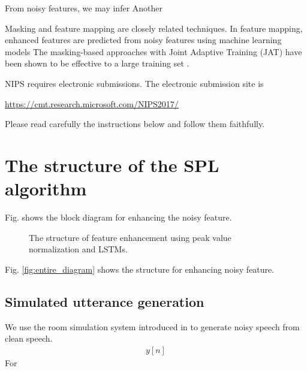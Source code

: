\documentclass{article}
\begin{document}
From noisy features, we may infer 
Another 

Masking and feature mapping are closely related techniques.
In feature mapping, enhanced features are predicted from
noisy features using machine learning models
The masking-based approaches with
Joint Adaptive Training (JAT) have been shown
to be effective to a large training set
\cite{a_narayanan_interspeech_2015_1}.




NIPS requires electronic submissions.  The electronic submission site
is
\begin{center}
  \url{https://cmt.research.microsoft.com/NIPS2017/}
\end{center}

Please read carefully the instructions below and follow them
faithfully.

\section{The structure of the SPL algorithm}

Fig. \label{fig:entire_diagram} shows the block diagram for
enhancing the noisy feature.

\begin{figure}
    \centering
    \resizebox{80mm}{!}{%
         } %
    \caption {
      The structure of feature enhancement using peak
      value normalization and LSTMs.
      \label{fig:entire_diagam}
    }
\end{figure}

Fig. \ref{fig:entire_diagram} shows the structure for enhancing
noisy feature.

\subsection{Simulated utterance generation}
We use the room simulation system introduced in
\cite{C_Kim_INTERSPEECH_2017_1} to generate noisy speech
from clean speech.
\begin{align}
  y[n]
\end{align}
For 
\end{document}
